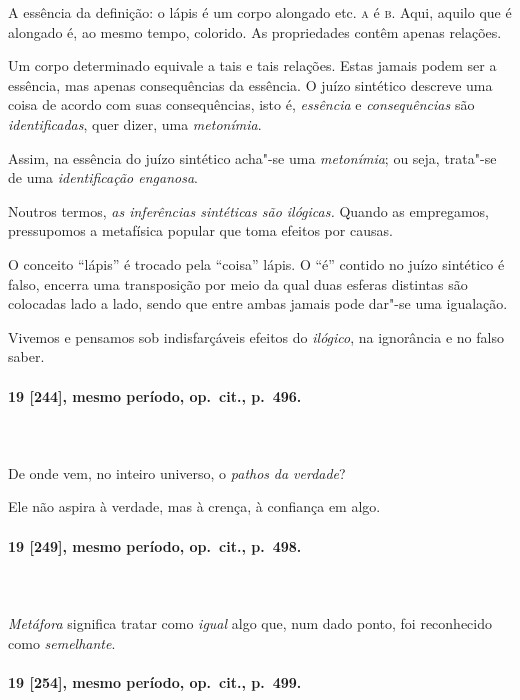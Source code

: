 A essência da definição: o lápis é um corpo alongado etc. \textsc{a} é \textsc{b}. Aqui,
aquilo que é alongado é, ao mesmo tempo, colorido. As propriedades
contêm apenas relações.

Um corpo determinado equivale a tais e tais relações. Estas jamais podem
ser a essência, mas apenas consequências da essência. O juízo sintético
descreve uma coisa de acordo com suas consequências, isto é,
\textit{essência} e \textit{consequências} são \textit{identificadas},
quer dizer, uma \textit{metonímia}.

Assim, na essência do juízo sintético acha"-se uma \textit{metonímia};
ou seja, trata"-se de uma \textit{identificação enganosa}.

Noutros termos, \textit{as inferências sintéticas são ilógicas.} Quando
as empregamos, pressupomos a metafísica popular que toma efeitos por
causas.

O conceito “lápis” é trocado pela “coisa” lápis. O “é” contido no juízo
sintético é falso, encerra uma transposição por meio da qual duas
esferas distintas são colocadas lado a lado, sendo que entre ambas
jamais pode dar"-se uma igualação.

Vivemos e pensamos sob indisfarçáveis efeitos do \textit{ilógico}, na
ignorância e no falso saber. 

\pagebreak
\paragraph*{19 [244], mesmo período, op.~cit., p.~496.}
\ \\
\ \\

De onde vem, no inteiro universo, o \textit{pathos} \textit{da verdade}?

Ele não aspira à verdade, mas à crença, à confiança em algo.

\pagebreak
\paragraph*{19 [249], mesmo período, op.~cit., p.~498.}
\ \\
\ \\

\textit{Metáfora} significa tratar como \textit{igual} algo que, num
dado ponto, foi reconhecido como \textit{semelhante}.

\pagebreak
\paragraph*{19 [254], mesmo período, op.~cit., p.~499.}
\ \\
\ \\

